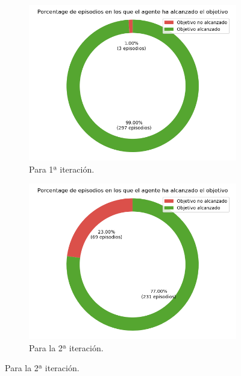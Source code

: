 \begin{figure}
    \centering
    \begin{subfigure}{.5\textwidth}
        \centering
        \includegraphics[scale=0.3]{cap5_experimentacion/images/CHANGE_ORIGIN-20-09_00-42-50_it1_porcentajeResuelto.png}
        \caption{Para 1ª iteración.}
        \label{fig:chg_org_it1_porcentajeResuelto}
    \end{subfigure}%
    \begin{subfigure}{.5\textwidth}
        \centering
        \includegraphics[scale=0.3]{cap5_experimentacion/images/CHANGE_ORIGIN-20-09_00-42-50_it2_porcentajeResuelto.png}
        \caption{Para la 2ª iteración.}
        \label{fig:chg_org_it2_porcentajeResuelto}

\end{subfigure}
\end{figure}
